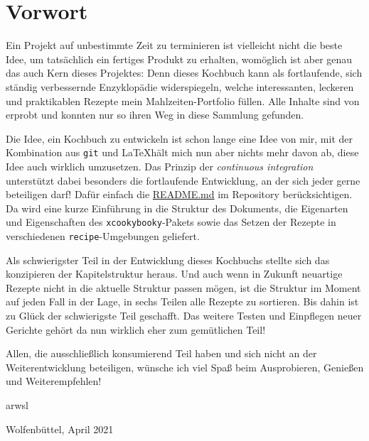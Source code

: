 \thispagestyle{empty}
\setcounter{page}{0}

\section*{Vorwort}
\label{sec:Vorwort}

Ein Projekt auf unbestimmte Zeit zu terminieren ist vielleicht nicht die beste Idee, um tatsächlich ein fertiges Produkt zu erhalten, womöglich ist aber genau das auch Kern dieses Projektes: Denn dieses Kochbuch kann als fortlaufende, sich ständig verbessernde Enzyklopädie widerspiegeln, welche interessanten, leckeren und praktikablen Rezepte mein Mahlzeiten-Portfolio füllen. Alle Inhalte sind von erprobt und konnten nur so ihren Weg in diese Sammlung gefunden.

Die Idee, ein Kochbuch zu entwickeln ist schon lange eine Idee von mir, mit der Kombination aus \texttt{git} und \LaTeX\:hält mich nun aber nichts mehr davon ab, diese Idee auch wirklich umzusetzen. Das Prinzip der \emph{continuous integration} unterstützt dabei besonders die fortlaufende Entwicklung, an der sich jeder gerne beteiligen darf! Dafür einfach die \href{https://github.com/arwsl/Bronte-Project}{README.md} im Repository berücksichtigen. Da wird eine kurze Einführung in die Struktur des Dokuments, die Eigenarten und Eigenschaften des \texttt{xcookybooky}-Pakets sowie das Setzen der Rezepte in verschiedenen \texttt{recipe}-Umgebungen geliefert.

Als schwierigster Teil in der Entwicklung dieses Kochbuchs stellte sich das konzipieren der Kapitelstruktur heraus. Und auch wenn in Zukunft neuartige Rezepte nicht in die aktuelle Struktur passen mögen, ist die Struktur im Moment auf jeden Fall in der Lage, in sechs Teilen alle Rezepte zu sortieren. Bis dahin ist zu Glück der schwierigste Teil geschafft. Das weitere Testen und Einpflegen neuer Gerichte gehört da nun wirklich eher zum gemütlichen Teil!

Allen, die ausschließlich konsumierend Teil haben und sich nicht an der Weiterentwicklung beteiligen, wünsche ich viel Spaß beim Ausprobieren, Genießen und Weiterempfehlen!

\vspace{1.5cm}
\hspace{1cm} arwsl
\begin{flushright}
	\hfill Wolfenbüttel, April 2021
\end{flushright}



\clearpage
